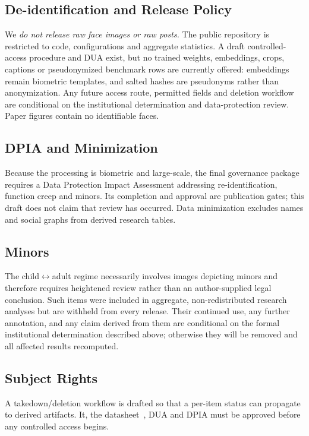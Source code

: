 \documentclass[journal]{IEEEtran}
\begin{document}
\subsection{De-identification and Release Policy}\label{sec:eth-deid}
We \emph{do not release raw face images or raw posts.} The public repository is restricted to code, configurations and aggregate statistics. A draft controlled-access procedure and DUA exist, but no trained weights, embeddings, crops, captions or pseudonymized benchmark rows are currently offered: embeddings remain biometric templates, and salted hashes are pseudonyms rather than anonymization. Any future access route, permitted fields and deletion workflow are conditional on the institutional determination and data-protection review. Paper figures contain no identifiable faces.

\subsection{DPIA and Minimization}\label{sec:eth-dpia}
Because the processing is biometric and large-scale, the final governance package requires a Data Protection Impact Assessment addressing re-identification, function creep and minors. Its completion and approval are publication gates; this draft does not claim that review has occurred. Data minimization excludes names and social graphs from derived research tables.

\subsection{Minors}\label{sec:eth-minors}
The child$\leftrightarrow$adult regime necessarily involves images depicting minors and therefore
requires heightened review rather than an author-supplied legal conclusion. Such items were included
in aggregate, non-redistributed research analyses but are withheld from every release. Their continued
use, any further annotation, and any claim derived from them are conditional on the formal
institutional determination described above; otherwise they will be removed and all affected results
recomputed.

\subsection{Subject Rights}\label{sec:eth-rights}
A takedown/deletion workflow is drafted so that a per-item status can propagate to derived artifacts. It, the datasheet~\cite{gebru2021datasheets}, DUA and DPIA must be approved before any controlled access begins.
\end{document}
